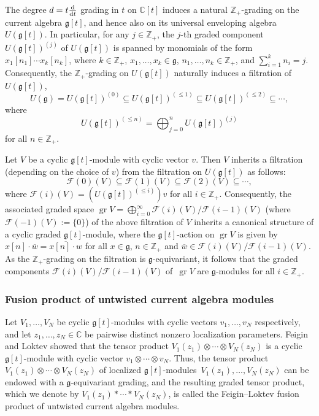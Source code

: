\documentclass[pdftex]{sigma}
\numberwithin{equation}{section}
\DeclareMathOperator{\gr}{gr}
\begin{document}
The degree $d=t\frac{\rm d}{{\rm d}t}$ grading in $t$ on $\mathbb{C}[t]$ induces a natural $\mathbb{Z}_+$-grading on the current algebra $\mathfrak{g}[t]$, and hence also on its universal enveloping algebra $U(\mathfrak{g}[t])$. In particular, for any $j\in\mathbb{Z}_+$, the $j$-th graded component $U(\mathfrak{g}[t])^{(j)}$ of $U(\mathfrak{g}[t])$ is spanned by monomials of the form $x_1[n_1]\cdots x_k[n_k]$, where $k\in\mathbb{Z}_+$, $x_1,\dots,x_k\in\mathfrak{g}$, $n_1,\dots,n_k\in\mathbb{Z}_+$, and $\sum_{i=1}^k n_i=j$. Consequently, the $\mathbb{Z}_+$-grading on $U(\mathfrak{g}[t])$ naturally induces a filtration of $U(\mathfrak{g}[t])$,
\begin{equation*}
U(\mathfrak{g})= U(\mathfrak{g}[t])^{(0)}\subseteq U(\mathfrak{g}[t])^{(\leq 1)}\subseteq U(\mathfrak{g}[t])^{(\leq 2)}\subseteq\cdots,
\end{equation*}
where
\[
U(\mathfrak{g}[t])^{(\leq n)}=\bigoplus_{j=0}^n U(\mathfrak{g}[t])^{(j)}
\]
 for all $n\in\mathbb{Z}_+$.

Let $V$ be a cyclic $\mathfrak{g}[t]$-module with cyclic vector $v$. Then $V$ inherits a filtration (depending on the choice of $v$) from the filtration on $U(\mathfrak{g}[t])$ as follows:
\begin{equation*}
\mathcal{F}(0)(V)\subseteq\mathcal{F}(1)(V)\subseteq\mathcal{F}(2)(V)\subseteq\cdots,
\end{equation*}
where $\mathcal{F}(i)(V)=(U(\mathfrak{g}[t])^{(\leq i)})v$ for all $i\in\mathbb{Z}_+$. Consequently, the associated graded space $\gr V=\bigoplus_{i=0}^{\infty}\mathcal{F}(i)(V)/\mathcal{F}(i-1)(V)$ (where $\mathcal{F}(-1)(V):=\{0\}$) of the above filtration of $V$ inherits a canonical structure of a cyclic graded $\mathfrak{g}[t]$-module, where the $\mathfrak{g}[t]$-action on $\gr V$ is given by~${x[n]\cdot\overline{w}=\overline{x[n]\cdot w}}$ for all $x\in\mathfrak{g}$, $n\in\mathbb{Z}_+$ and $\overline{w}\in\mathcal{F}(i)(V)/\mathcal{F}(i-1)(V)$. As the $\mathbb{Z}_+$-grading on the filtration is $\mathfrak{g}$-equivariant, it follows that the graded components $\mathcal{F}(i)(V)/\mathcal{F}(i-1)(V)$ of~$\gr V$ are $\mathfrak{g}$-modules for all $i\in\mathbb{Z}_+$.

\subsubsection{Fusion product of untwisted current algebra modules}\label{Section 2.2.3}

Let $V_1,\dots,V_N$ be cyclic $\mathfrak{g}[t]$-modules with cyclic vectors $v_1,\dots,v_N$ respectively, and let $z_1,\dots,\allowbreak z_N\in\mathbb{C}$ be pairwise distinct nonzero localization parameters. Feigin and Loktev \cite[Proposition 1.4]{FL99} showed that the tensor product $V_1(z_1)\otimes\cdots\otimes V_N(z_N)$ is a cyclic $\mathfrak{g}[t]$-module with cyclic vector $v_1\otimes\cdots\otimes v_N$. Thus, the tensor product $V_1(z_1)\otimes\cdots\otimes V_N(z_N)$ of localized $\mathfrak{g}[t]$-modules~${V_1(z_1),\dots,V_N(z_N)}$ can be endowed with a $\mathfrak{g}$-equivariant grading, and the resulting graded tensor product, which we denote by $V_1(z_1)*\cdots*V_N(z_N)$, is called the Feigin--Loktev fusion product of untwisted current algebra modules.
\end{document}
